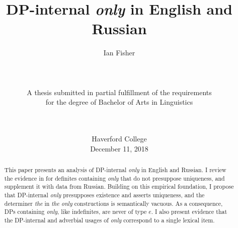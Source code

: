 \documentclass{article}
\title{DP-internal \textit{only} in English and Russian}
\author{Ian Fisher \\ \\ \\ \\ A thesis submitted in partial fulfillment of the requirements \\ for the degree of Bachelor of Arts in Linguistics \\ \\ \\}  %
\date{Haverford College \\ December 11, 2018}
\begin{document}
\maketitle

\begin{abstract}
This paper presents an analysis of DP-internal \textit{only} in English and Russian. I review the evidence in \citet{cb2012b, cb2015} for definites containing \textit{only} that do not presuppose uniqueness, and supplement it with data from Russian. Building on this empirical foundation, I propose that DP-internal \textit{only} presupposes existence and asserts uniqueness, and the determiner \textit{the} in \textit{the only} constructions is semantically vacuous. As a consequence, DPs containing \textit{only}, like indefinites, are never of type $e$. I also present evidence that the DP-internal and adverbial usages of \textit{only} correspond to a single lexical item.
\end{abstract}

\newpage












\end{document}
